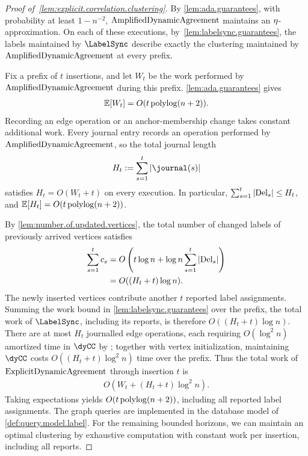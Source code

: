 \begin{proof}[Proof of~\cref{lem:explicit.correlation.clustering}]
    By \cref{lem:ada.guarantees}, with probability at least $ 1-n^{-2} $, $ \mathrm{AmplifiedDynamicAgreement} $ maintains an $ \eta $-approximation.
    On each of these executions, by~\cref{lem:labelsync.guarantees}, the labels maintained by $ \LabelSync $ describe exactly the clustering maintained by $ \mathrm{AmplifiedDynamicAgreement} $ at every prefix.

    Fix a prefix of $ t $ insertions, and let $ W_t $ be the work performed by $ \mathrm{AmplifiedDynamicAgreement} $ during this prefix.
    \cref{lem:ada.guarantees} gives
    \begin{align}
        \mathbb E[W_t]=O(t\operatorname{polylog}(n+2)).
    \end{align}
    Recording an edge operation or an anchor-membership change takes constant additional work.
    Every journal entry records an operation performed by $ \mathrm{AmplifiedDynamicAgreement} $, so the total journal length
    \begin{align}
        H_t:=\sum_{s=1}^{t}\jnTime{s}
    \end{align}
    satisfies $ H_t=O(W_t+t) $ on every execution.
    In particular, $ \sum_{s=1}^{t}\left\lvert \mathrm{Del}_{s} \right \rvert\le H_t $, and $ \mathbb E[H_t]=O(t\operatorname{polylog}(n+2)) $.

    By \cref{lem:number.of.updated.vertices}, the total number of changed labels of previously arrived vertices satisfies
    \begin{align}
        \sum_{s=1}^{t}c_{s}
        &=O\left(t\log n+\log n\sum_{s=1}^{t}\left\lvert \mathrm{Del}_{s} \right \rvert\right) \\
        &=O((H_t+t)\log n).
    \end{align}
    The newly inserted vertices contribute another $ t $ reported label assignments.
    Summing the work bound in \cref{lem:labelsync.guarantees} over the prefix, the total work of $ \LabelSync $, including its reports, is therefore $ O((H_t+t)\log n) $.
    There are at most $ H_t $ journalled edge operations, each requiring $ O(\log^2 n) $ amortized time in $ \dyCC $ by \cite{holm2001poly}; together with vertex initialization, maintaining $ \dyCC $ costs $ O((H_t+t)\log^2 n) $ time over the prefix.
    Thus the total work of $ \mathrm{ExplicitDynamicAgreement} $ through insertion $ t $ is
    \begin{align}
        O(W_t+(H_t+t)\log^2 n).
    \end{align}
    Taking expectations yields $ O(t\operatorname{polylog}(n+2)) $, including all reported label assignments.
    The graph queries are implemented in the database model of \cref{def:query.model.label}.
    For the remaining bounded horizons, we can maintain an optimal clustering by exhaustive computation with constant work per insertion, including all reports.
\end{proof}

